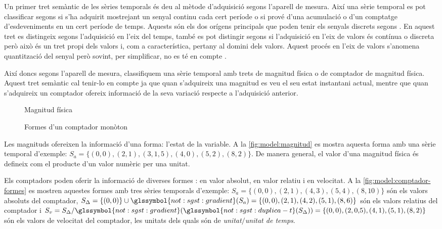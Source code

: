 Un primer tret semàntic de les sèries temporals és deu al mètode
d'adquisició segons l'aparell de mesura. Així una sèrie temporal es
pot classificar segons si s'ha adquirit mostrejant un senyal continu
cada cert període o si prové d'una acumulació o d'un comptatge
d'esdeveniments en un cert període de temps. Aquests són els dos
orígens principals que poden tenir els senyals discrets segons
\textcite[cap.~1]{proakismanolakis96}.  En aquest tret es distingeix
segons l'adquisició en l'eix del temps, també es pot distingir segons
si l'adquisició en l'eix de valors és contínua o discreta però això és
un tret propi dels valors i, com a característica, pertany al domini
dels valors. Aquest procés en l'eix de valors s'anomena quantització
del senyal però sovint, per simplificar, no es té en
compte \parencite{proakismanolakis96}.%



Així doncs segons l'aparell de mesura, classifiquem una sèrie
temporal amb trets de magnitud física o de comptador de magnitud
física. Aquest tret semàntic cal tenir-lo en compte ja que quan
s'adquireix una magnitud es veu el seu estat instantani actual, mentre
que quan s'adquireix un comptador ofereix informació de la seva
variació respecte a l'adquisició anterior.


\begin{figure}[tp]
  \centering
  
  \caption{Magnitud física}
  \label{fig:model:magnitud}
\end{figure}

\begin{figure}[tp]
  \centering
  
  \caption{Formes d'un comptador monòton}
  \label{fig:model:comptador-formes}
\end{figure}



Les magnituds ofereixen la informació d'una forma: l'estat de la
variable. A la \autoref{fig:model:magnitud} es mostra aquesta forma
amb una sèrie temporal d'exemple: $S_a = \{(0,0),(2,1),(3,
1{,}5),(4,0),(5,2),(8,2)\}$. De manera general, el valor d’una
magnitud física és defineix com el producte d’un valor numèric per una
unitat.


Els comptadors poden oferir la informació de diverses formes : en
valor absolut, en valor relatiu i en velocitat. A la
\autoref{fig:model:comptador-formes} es mostren aquestes formes amb
tres sèries temporals d'exemple: $S_a =
\{(0,0),(2,1),(4,3),(5,4),(8,10)\}$ són els valors absoluts del
comptador, $S_\Delta = \{(0,0)\} \cup
\glssymbol{not:sgst:gradient}(S_a) =
\{(0,0),(2,1),(4,2),(5,1),(8,6)\}$ són els valors relatius del
comptador i $S_v = S_\Delta /
\glssymbol{not:sgst:gradient}(\glssymbol{not:sgst:duplica-t}(S_\Delta))
= \{(0,0),(2,0{,}5),(4,1),(5,1),(8,2)\}$ són els valors de velocitat
del comptador, les unitats dels quals són de \emph{unitat$/$unitat de temps}.



